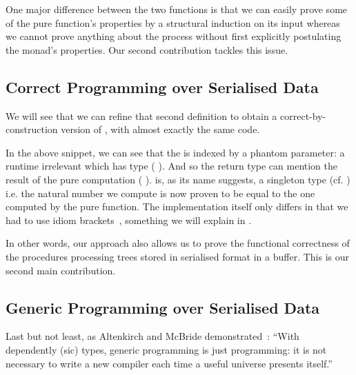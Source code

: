 One major difference between the two functions is that
we can easily prove some of the pure function's properties by a structural
induction on its input whereas we
cannot prove anything about the  process without first
explicitly postulating the  monad's properties.
%
Our second contribution tackles this issue.

\subsection{Correct Programming over Serialised Data}

We will see that we can refine that second definition to obtain
a correct-by-construction version of
, with almost exactly the same code.

\begin{center}
  \begin{minipage}{.7\textwidth}
  \end{minipage}
\end{center}

In the above snippet, we can see that the  is indexed
by a phantom parameter: a runtime irrelevant  which has type
( ).
%
And so the return type can mention the result of the pure computation
( ).
%
 is, as its name suggests, a singleton type
(cf. )
i.e. the natural number we compute is now proven to be equal to the
one computed by the pure  function.
%
The implementation itself only differs in that we had to use idiom
brackets~\cite{DBLP:journals/jfp/McbrideP08}, something we will explain
in .

In other words, our approach also allows us to prove the functional
correctness of the  procedures processing trees stored
in serialised format in a buffer. This is our second main contribution.

\subsection{Generic Programming over Serialised Data}

Last but not least, as Altenkirch and McBride
demonstrated~\cite{DBLP:conf/ifip2-1/AltenkirchM02}:
``With dependently (sic) types, generic programming is just programming:
it is not necessary to write a new compiler each time a useful
universe presents itself.''

